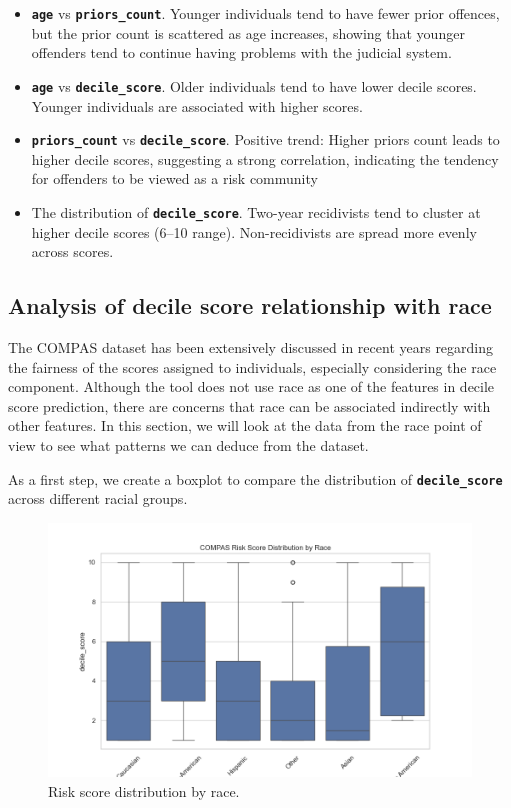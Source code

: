 \begin{itemize}
	\item \textbf{\texttt{age}} vs \textbf{\texttt{priors\_count}}. Younger individuals tend to have fewer prior offences, but the prior count is scattered as age increases, showing that younger offenders tend to continue having problems with the judicial system.
	
	\item \textbf{\texttt{age}} vs \textbf{\texttt{decile\_score}}. Older individuals tend to have lower decile scores. Younger individuals are associated with higher scores.
	
	\item \textbf{\texttt{priors\_count}} vs \textbf{\texttt{decile\_score}}. Positive trend: Higher priors count leads to higher decile scores, suggesting a strong correlation, indicating the tendency for offenders to be viewed as a risk community    
	
	\item The distribution of \textbf{\texttt{decile\_score}}. Two-year recidivists tend to cluster at higher decile scores (6–10 range). Non-recidivists are spread more evenly across scores.        
\end{itemize}



\subsection{Analysis of decile score relationship with race}

The COMPAS dataset has been extensively discussed in recent years regarding the fairness of the scores assigned to individuals, especially considering the race component. Although the tool does not use race as one of the features in decile score prediction, there are concerns that race can be associated indirectly with other features. In this section, we will look at the data from the race point of view to see what patterns we can deduce from the dataset.

As a first step, we create a boxplot to compare the distribution of \textbf{\texttt{decile\_score}} across different racial groups. 

\begin{figure}[H]
	\centering
	\includegraphics[width=0.7\linewidth]{img/decile_score_by_race_boxplot}
	\caption{Risk score distribution by race.}
	\label{fig:decilescorebyraceboxplot}
\end{figure}


